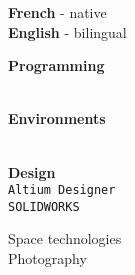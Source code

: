 \documentclass[9pt]{developercv} %
\begin{document}
\begin{minipage}[t]{0.18\textwidth}
		\textbf{French} - native\\
		\textbf{English} - bilingual

		\textbf{Programming}
		\begin{barchart}{1.75}
		\end{barchart}
		\\
		\textbf{Environments}
		\begin{barchart}{1.75}
		\end{barchart}
		\\
		\textbf{Design}\\
		\texttt{Altium Designer}\\
		\texttt{SOLIDWORKS}

		Space technologies\\
		Photography
\end{minipage}

\end{document}
